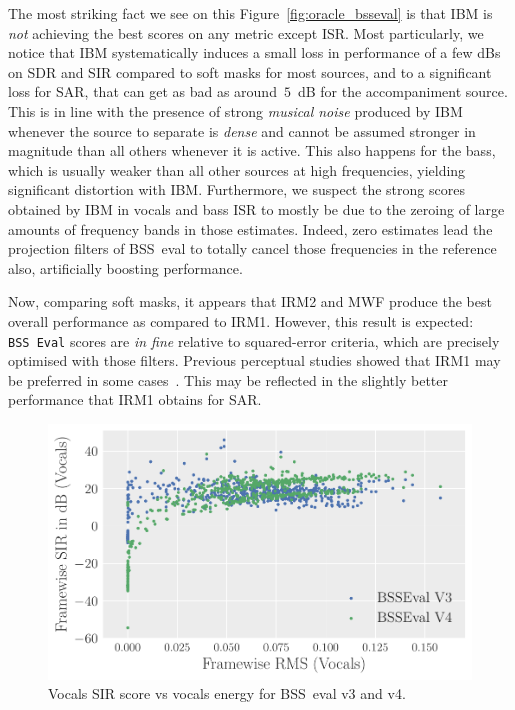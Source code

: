 \documentclass{llncs}
\begin{document}
The most striking fact we see on this Figure~\ref{fig:oracle_bsseval} is that IBM is \textit{not} achieving the best scores on any metric except ISR. Most particularly, we notice that IBM systematically induces a small loss in performance of a few dBs on SDR and SIR compared to soft masks for most sources, and to a significant loss for SAR, that can get as bad as around~$5$~dB for the accompaniment source. This is in line with the presence of strong \textit{musical noise} produced by IBM whenever the source to separate is \textit{dense} and cannot be assumed stronger in magnitude than all others whenever it is active. This also happens for the bass, which is usually weaker than all other sources at high frequencies, yielding significant distortion with IBM. Furthermore, we suspect the strong scores obtained by IBM in vocals and bass ISR to mostly be due to the zeroing of large amounts of frequency bands in those estimates. Indeed, zero estimates lead the projection filters of BSS~eval to totally cancel those frequencies in the reference also, artificially boosting performance.

Now, comparing soft masks, it appears that IRM2 and MWF produce the best overall performance as compared to IRM1. However, this result is expected: \texttt{BSS~Eval} scores are \textit{in fine} relative to squared-error criteria, which are precisely optimised with those filters. Previous perceptual studies showed that IRM1 may be preferred in some cases~\cite{liutkus15}. This may be reflected in the slightly better performance that IRM1 obtains for SAR.


\begin{figure}[ht]
  \begin{center}
     \includegraphics[width=\linewidth]{fig/evaluation_v3v4.pdf}
     \vspace{-1cm}
  \end{center}
  \caption{Vocals SIR score vs vocals energy for BSS~eval v3 and v4.  }
  \label{fig:v3v4}
\end{figure}
\end{document}
